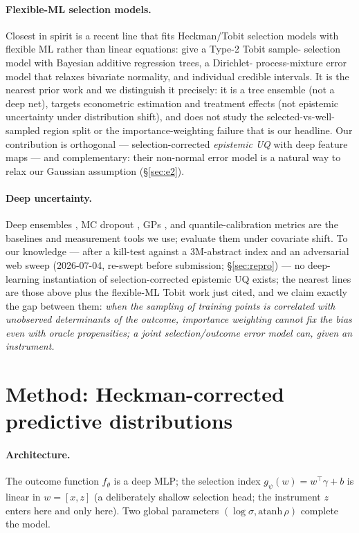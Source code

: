 \documentclass[10pt]{article}
\begin{document}
\paragraph{Flexible-ML selection models.} Closest in spirit is a recent
line that fits Heckman/Tobit selection models with flexible ML rather than
linear equations: \citet{oneill2025tobart} give a Type-2 Tobit sample-
selection model with Bayesian additive regression trees, a Dirichlet-
process-mixture error model that relaxes bivariate normality, and
individual credible intervals. It is the nearest prior work and we
distinguish it precisely: it is a tree ensemble (not a deep net), targets
econometric estimation and treatment effects (not epistemic uncertainty
under distribution shift), and does not study the selected-vs-well-sampled
region split or the importance-weighting failure that is our headline. Our
contribution is orthogonal --- selection-corrected \emph{epistemic UQ} with
deep feature maps --- and complementary: their non-normal error model is a
natural way to relax our Gaussian assumption (\S\ref{sec:e2}).

\paragraph{Deep uncertainty.} Deep ensembles
\citep{lakshminarayanan2017}, MC dropout \citep{gal2016}, GPs
\citep{rasmussen2006}, and quantile-calibration metrics
\citep{kuleshov2018} are the baselines and measurement tools we use;
\citet{ovadia2019} evaluate them under covariate shift. To our knowledge
--- after a kill-test against a 3M-abstract index and an adversarial web
sweep (2026-07-04, re-swept before submission; \S\ref{sec:repro}) --- no
deep-learning instantiation of selection-corrected epistemic UQ exists;
the nearest lines are those above plus the flexible-ML Tobit work just
cited, and we claim exactly the gap between them: \emph{when the sampling
of training points is correlated with unobserved determinants of the
outcome, importance weighting cannot fix the bias even with oracle
propensities; a joint selection/outcome error model can, given an
instrument.}

\section{Method: Heckman-corrected predictive distributions}
\label{sec:method}

\paragraph{Architecture.} The outcome function $f_\theta$ is a deep MLP;
the selection index $g_\psi(w) = w^\top\gamma + b$ is linear in $w = [x,
z]$ (a deliberately shallow selection head; the instrument $z$ enters
here and only here). Two global parameters $(\log\sigma,
\mathrm{atanh}\,\rho)$ complete the model.
\end{document}
